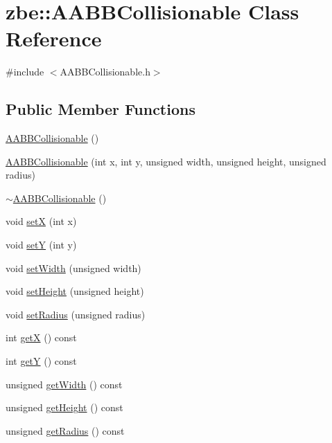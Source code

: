 \hypertarget{classzbe_1_1_a_a_b_b_collisionable}{}\section{zbe\+:\+:A\+A\+B\+B\+Collisionable Class Reference}
\label{classzbe_1_1_a_a_b_b_collisionable}


{\ttfamily \#include $<$A\+A\+B\+B\+Collisionable.\+h$>$}

\subsection*{Public Member Functions}
\begin{DoxyCompactItemize}
\item 
\hyperlink{classzbe_1_1_a_a_b_b_collisionable_a2c618917a1305b1f1c3f133dd57f43eb}{A\+A\+B\+B\+Collisionable} ()
\item 
\hyperlink{classzbe_1_1_a_a_b_b_collisionable_aadebaf0722b4bd0e9749658f0c7c29bc}{A\+A\+B\+B\+Collisionable} (int x, int y, unsigned width, unsigned height, unsigned radius)
\item 
\hyperlink{classzbe_1_1_a_a_b_b_collisionable_a2bdc3582874cffcc4c0e9d0309a55d3c}{$\sim$\+A\+A\+B\+B\+Collisionable} ()
\item 
void \hyperlink{classzbe_1_1_a_a_b_b_collisionable_a09ce11d77821bef2b83f03f2ee35ee0e}{set\+X} (int x)
\item 
void \hyperlink{classzbe_1_1_a_a_b_b_collisionable_a27f67daba6fd935cb0b454801a6bbf2e}{set\+Y} (int y)
\item 
void \hyperlink{classzbe_1_1_a_a_b_b_collisionable_a36336aea2619b7de7a94d14cfc289ce3}{set\+Width} (unsigned width)
\item 
void \hyperlink{classzbe_1_1_a_a_b_b_collisionable_a323e9d9ac50c752e300b97570cc69fd6}{set\+Height} (unsigned height)
\item 
void \hyperlink{classzbe_1_1_a_a_b_b_collisionable_a8e7cc35084c4bea04ce93f5d35db736a}{set\+Radius} (unsigned radius)
\item 
int \hyperlink{classzbe_1_1_a_a_b_b_collisionable_acca6f2333b2c225945c87862866e5163}{get\+X} () const 
\item 
int \hyperlink{classzbe_1_1_a_a_b_b_collisionable_a9ecee81fbd576f86a2480876e9bb226d}{get\+Y} () const 
\item 
unsigned \hyperlink{classzbe_1_1_a_a_b_b_collisionable_add5a7671229494a0668e14e0249ffa46}{get\+Width} () const 
\item 
unsigned \hyperlink{classzbe_1_1_a_a_b_b_collisionable_a734efe0e0654be4a9c319d5f22992dba}{get\+Height} () const 
\item 
unsigned \hyperlink{classzbe_1_1_a_a_b_b_collisionable_ae6db8c180e3dc9e9323f2c6c7803a87c}{get\+Radius} () const 
\end{DoxyCompactItemize}


